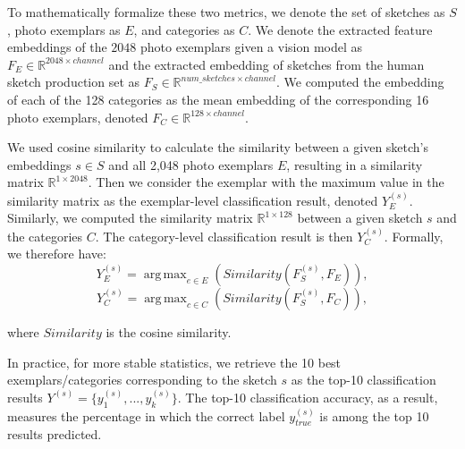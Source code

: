 \documentclass[10pt,letterpaper]{article}
\DeclareMathOperator*{\argmax}{arg\,max} %
\begin{document}
\noindent To mathematically formalize these two metrics, we denote the set of sketches as $S$, photo exemplars as $E$, and categories as $C$. 
We denote the extracted feature embeddings of the $2048$ photo exemplars given a vision model as $F_{E} \in \mathbb{R}^{2048\times channel}$ and the extracted embedding of sketches from the human sketch production set as $F_{S} \in \mathbb{R}^{num\_sketches\times channel}$.
We computed the embedding of each of the 128 categories as the mean embedding of the corresponding 16 photo exemplars, denoted $F_{C} \in \mathbb{R}^{128 \times channel}$.

We used cosine similarity to calculate the similarity between a given sketch's embeddings $s\in S$ and all 2,048 photo exemplars $E$, resulting in a similarity matrix $\mathbb{R}^{1 \times 2048}$. Then we consider the exemplar with the maximum value in the similarity matrix as the exemplar-level classification result, denoted $Y_{E}^{(s)}$.
Similarly, we computed the similarity matrix $\mathbb{R}^{1 \times 128}$ between a given sketch $s$ and the categories $C$. The category-level classification result is then $Y_{C}^{(s)}$.
Formally, we therefore have:
\begin{equation}\label{eq:p exemplar}
    Y_{E}^{(s)} = \argmax_{e\in E} (Similarity(F_{S}^{(s)}, F_{E})),
\end{equation}
\vspace{-1em}
\begin{equation}\label{eq:p category}
    Y_{C}^{(s)} = \argmax_{c\in C} (Similarity(F_{S}^{(s)}, F_{C})),
\end{equation}

where $Similarity$ is the cosine similarity.

In practice, for more stable statistics,  we retrieve the 10 best exemplars/categories corresponding to the sketch $s$ as the top-10 classification results $Y^{(s)} = \{y_1^{(s)}, ..., y_k^{(s)}\}$. The top-10 classification accuracy, as a result, measures the percentage in which the correct label $y_{true}^{(s)}$ is among the top 10 results predicted.
\end{document}
